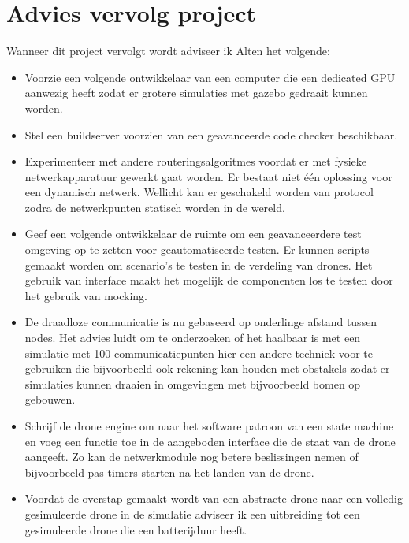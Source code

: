 \documentclass[a4paper, 11pt, oneside]{report}
\begin{document}
\section{Advies vervolg project}\label{sec:advies-vervolg-project}
Wanneer dit project vervolgt wordt adviseer ik Alten het volgende:
\begin{itemize}
	\item Voorzie een volgende ontwikkelaar van een computer die een dedicated GPU aanwezig heeft zodat er grotere simulaties met gazebo gedraait kunnen worden.
	
	\item Stel een buildserver voorzien van een geavanceerde code checker beschikbaar.
	 
	\item Experimenteer met andere routeringsalgoritmes voordat er met fysieke netwerkapparatuur gewerkt gaat worden. Er bestaat niet één oplossing voor een dynamisch netwerk. Wellicht kan er geschakeld worden van protocol zodra de netwerkpunten statisch worden in de wereld.  
	
	\item Geef een volgende ontwikkelaar de ruimte om een geavanceerdere test omgeving op te zetten voor geautomatiseerde testen.
	Er kunnen scripts gemaakt worden om scenario's te testen in de verdeling van drones. Het gebruik van interface maakt het mogelijk de componenten los te testen door het gebruik van mocking.
	
	\item De draadloze communicatie is nu gebaseerd op onderlinge afstand tussen nodes. Het advies luidt om te onderzoeken of het haalbaar is met een simulatie met 100 communicatiepunten hier een andere techniek voor te gebruiken die bijvoorbeeld ook rekening kan houden met obstakels zodat er simulaties kunnen draaien in omgevingen met bijvoorbeeld bomen op gebouwen.
	
	\item Schrijf de drone engine om naar het software patroon van een state machine en voeg een functie toe in de aangeboden interface die de staat van de drone aangeeft. Zo kan de netwerkmodule nog betere beslissingen nemen of bijvoorbeeld pas timers starten na het landen van de drone.
	\item Voordat de overstap gemaakt wordt van een abstracte drone naar een volledig gesimuleerde drone in de simulatie adviseer ik een uitbreiding tot een gesimuleerde drone die een batterijduur heeft.
\end{itemize}




\clearpage
\appendix
\end{document}
